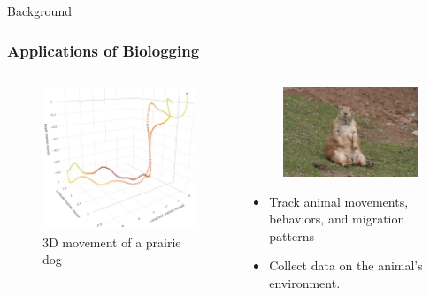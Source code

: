 \documentclass{beamer}
\begin{document}
\begin{frame}{Background}
  \frametitle{Applications of Biologging}
  \begin{columns}
    \begin{column}{0.5\textwidth}
  \begin{figure}[htbp]
    \centering
    \includegraphics[width=\textwidth]{images/prairie_dog_map.jpg}
    \caption{3D movement of a prairie dog \cite{Kidangoor_2024}}
    \label{fig:prairie_dog_3D_movement}
  \end{figure}
\end{column}
\begin{column}{0.5\textwidth}
  \begin{figure}[htbp]
    \centering
    \includegraphics[width=.5\textwidth]{images/prairie_dog.jpg}
    \label{fig:prairie_dog}
  \end{figure}
  \begin{itemize}
    \item Track animal movements, behaviors, and migration patterns
    \item Collect data on the animal's environment.
  \end{itemize}
\end{column}
\end{columns}
\end{frame}
\end{document}
